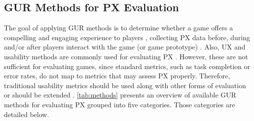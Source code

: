 \subsection{\ac{GUR} Methods for \ac{PX} Evaluation}
\label{subsec:methods}
The goal of applying \ac{GUR} methods is to determine whether a game offers a compelling and engaging experience to players \autocite{Yanez-Gomez2017,Bernhaupt2015}, collecting \ac{PX} data before, during and/or after players interact with the game (or game prototype) \autocite{Wiemeyer2016,Nacke2015,Mueller2015,Drachen2013}. Also, \ac{UX} and usability methods are commonly used for evaluating \ac{PX} \autocite{Yanez-Gomez2017,McAllister2015}. However, these are not sufficient for evaluating games, since standard metrics, such as task completion or error rates, do not map to metrics that may assess \ac{PX} properly. Therefore, traditional usability metrics should be used along with other forms of evaluation or should be extended \autocite{Wiemeyer2016,McAllister2015,Bernhaupt2015,Nackea,Hoysniemi2006}. \autoref{tab:methods} presents an overview of available \ac{GUR} methods for evaluating \ac{PX} grouped into five categories. Those categories are detailed below.

